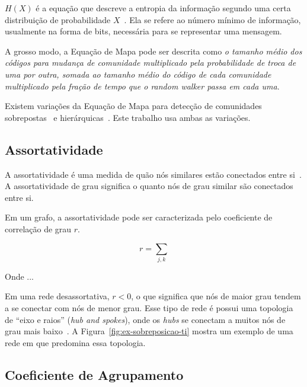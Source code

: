 \documentclass[
  article,
  11pt,
  a4paper,
  english,
  brazil,
  sumario=tradicional]{abntex2}
\begin{document}
$H(X)$ é a equação que descreve a entropia da informação segundo uma certa distribuição de probabilidade $X$~\cite{Shannon1948-ic}. Ela se refere ao número mínimo de informação, usualmente na forma de bits, necessária para se representar uma mensagem.

A grosso modo, a Equação de Mapa pode ser descrita como \textit{o tamanho médio dos códigos para mudança de comunidade multiplicado pela probabilidade de troca de uma por outra, somada ao tamanho médio do código de cada comunidade multiplicado pela fração de tempo que o \textit{random walker} passa em cada uma}.

Existem variações da Equação de Mapa para detecção de comunidades sobrepostas~\cite{Viamontes_Esquivel2011-it} e hierárquicas~\cite{Rosvall2011-yi}. Este trabalho usa ambas as variações.


\subsection{Assortatividade} \label{sec:assortatividade}

A assortatividade é uma medida de quão nós similares estão conectados entre si~\cite{Newman2003-jn}. A assortatividade de grau significa o quanto nós de grau similar são conectados entre si.

Em um grafo, a assortatividade pode ser caracterizada pelo coeficiente de correlação de grau $r$.

\begin{equation*}
r = \sum_{j,k}
\end{equation*}

Onde ...

Em uma rede desassortativa, $r < 0$, o que significa que nós de maior grau tendem a se conectar com nós de menor grau. Esse tipo de rede é possui uma topologia de \enquote{eixo e raios} (\textit{hub and spokes}), onde os \textit{hubs} se conectam a muitos nós de grau mais baixo~\cite{Barabasi2016-rn}. A Figura~\ref{fig:ex-sobreposicao-ti} mostra um exemplo de uma rede em que predomina essa topologia.

\subsection{Coeficiente de Agrupamento} \label{sec:coef-agrupamento}
\end{document}
